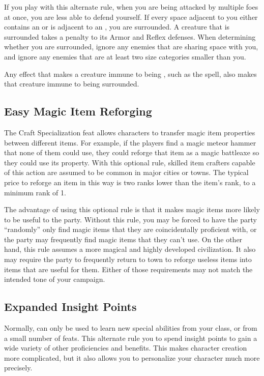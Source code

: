         If you play with this alternate rule, when you are being attacked by multiple foes at once, you are less able to defend yourself.
        If every space adjacent to you either contains an  or is adjacent to an , you are surrounded.
        A creature that is surrounded takes a  penalty to its Armor and Reflex defenses.
        When determining whether you are surrounded, ignore any enemies that are sharing space with you, and ignore any enemies that are at least two size categories smaller than you.

        Any effect that makes a creature immune to being \partiallyunaware, such as the  spell, also makes that creature immune to being surrounded.

    \subsection{Easy Magic Item Reforging}
        The Craft Specialization feat allows characters to transfer magic item properties between different items.
        For example, if the players find a magic meteor hammer that none of them could use, they could reforge that item as a magic battleaxe so they could use its property.
        With this optional rule, skilled item crafters capable of this action are assumed to be common in major cities or towns.
        The typical price to reforge an item in this way is two ranks lower than the item's rank, to a minimum rank of 1.

        The advantage of using this optional rule is that it makes magic items more likely to be useful to the party.
        Without this rule, you may be forced to have the party ``randomly'' only find magic items that they are coincidentally proficient with, or the party may frequently find magic items that they can't use.
        On the other hand, this rule assumes a more magical and highly developed civilization.
        It also may require the party to frequently return to town to reforge useless items into items that are useful for them.
        Either of those requirements may not match the intended tone of your campaign.

    \subsection{Expanded Insight Points}
        Normally,  can only be used to learn new special abilities from your class, or from a small number of feats.
        This alternate rule you to spend insight points to gain a wide variety of other proficiencies and benefits.
        This makes character creation more complicated, but it also allows you to personalize your character much more precisely.

